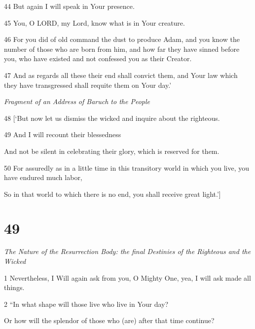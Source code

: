 \par 44 But again I will speak in Your presence. 

\par 45 You, O LORD, my Lord, know what is in Your creature. 

\par 46 For you did of old command the dust to produce Adam, and you know the number of those who are born from him, and how far they have sinned before you, who have existed and not confessed you as their Creator. 

\par 47 And as regards all these their end shall convict them, and Your law which they have transgressed shall requite them on Your day.’

\par \textit{Fragment of an Address of Baruch to the People}

\par 48 [‘But now let us dismiss the wicked and inquire about the righteous.

\par 49 And I will recount their blessedness

\par And not be silent in celebrating their glory, which is reserved for them.

\par 50 For assuredly as in a little time in this transitory world in which you live, you have endured much labor,

\par So in that world to which there is no end, you shall receive great light.’]

\chapter{49}

\par \textit{The Nature of the Resurrection Body: the final Destinies of the Righteous and the Wicked}

\par 1 Nevertheless, I Will again ask from you, O Mighty One, yea, I will ask made all things.

\par 2 “In what shape will those live who live in Your day?

\par Or how will the splendor of those who (are) after that time continue?

